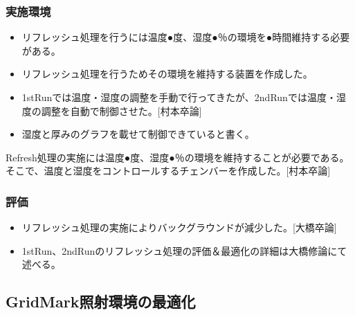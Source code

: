 \documentclass[12pt,a4paper]{jarticle}
\begin{document}
\subsubsection{実施環境}
\begin{itemize}
 \item リフレッシュ処理を行うには温度●度、湿度●％の環境を●時間維持する必要がある。
 \item リフレッシュ処理を行うためその環境を維持する装置を作成した。
 \item 1stRunでは温度・湿度の調整を手動で行ってきたが、2ndRunでは温度・湿度の調整を自動で制御させた。[村本卒論]
 \item 湿度と厚みのグラフを載せて制御できていると書く。
\end{itemize}
Refresh処理の実施には温度●度、湿度●％の環境を維持することが必要である。
そこで、温度と湿度をコントロールするチェンバーを作成した。[村本卒論]
\subsubsection{評価}
\begin{itemize}
 \item リフレッシュ処理の実施によりバックグラウンドが減少した。[大橋卒論]
 \item 1stRun、2ndRunのリフレッシュ処理の評価＆最適化の詳細は大橋修論にて述べる。
\end{itemize}
\subsection{GridMark照射環境の最適化}
\end{document}
